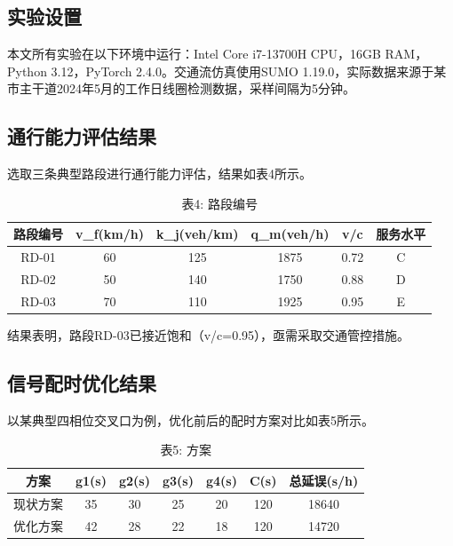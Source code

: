 \subsection{实验设置}

本文所有实验在以下环境中运行：Intel Core i7-13700H CPU，16GB RAM，Python 3.12，PyTorch 2.4.0。交通流仿真使用SUMO 1.19.0，实际数据来源于某市主干道2024年5月的工作日线圈检测数据，采样间隔为5分钟。

\subsection{通行能力评估结果}

选取三条典型路段进行通行能力评估，结果如表4所示。

\begin{table}[H]
  \centering
  \caption{表4: 路段编号}
  \label{tab:4}
  \begin{tabular}{cccccc}
    \toprule
    路段编号 & v\_f(km/h) & k\_j(veh/km) & q\_m(veh/h) & v/c & 服务水平 \\
    \midrule
    RD-01 & 60 & 125 & 1875 & 0.72 & C \\
    RD-02 & 50 & 140 & 1750 & 0.88 & D \\
    RD-03 & 70 & 110 & 1925 & 0.95 & E \\
    \bottomrule
  \end{tabular}
\end{table}

结果表明，路段RD-03已接近饱和（v/c=0.95），亟需采取交通管控措施。

\subsection{信号配时优化结果}

以某典型四相位交叉口为例，优化前后的配时方案对比如表5所示。

\begin{table}[H]
  \centering
  \caption{表5: 方案}
  \label{tab:5}
  \begin{tabular}{ccccccc}
    \toprule
    方案 & g1(s) & g2(s) & g3(s) & g4(s) & C(s) & 总延误(s/h) \\
    \midrule
    现状方案 & 35 & 30 & 25 & 20 & 120 & 18640 \\
    优化方案 & 42 & 28 & 22 & 18 & 120 & 14720 \\
    \bottomrule
  \end{tabular}
\end{table}

